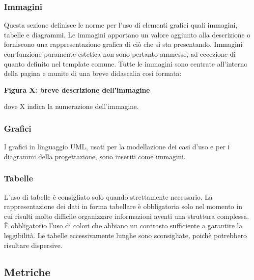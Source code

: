 \subsubsection{Immagini}\label{ProcessiDiSupportoDocumentazioneElementiGraficiImmagini}
Questa sezione definisce le norme per l'uso di elementi grafici quali immagini, tabelle e diagrammi.
Le immagini apportano un valore aggiunto alla descrizione o forniscono una rappresentazione grafica di ciò che si sta presentando. Immagini con funzione puramente estetica non sono pertanto ammesse, ad eccezione di quanto definito nel template comune. Tutte le immagini sono centrate all’interno della pagina e munite di una breve didascalia così formata:
\begin{center}
	\textbf {Figura X: breve descrizione dell'immagine}
\end{center}
dove X indica la numerazione dell'immagine.
\subsubsection{Grafici}\label{ProcessiDiSupportoDocumentazioneElementiGraficiGrafici}
I grafici in linguaggio UML, usati per la modellazione dei casi d’uso e per i diagrammi della progettazione, sono inseriti come immagini.
\subsubsection{Tabelle}\label{ProcessiDiSupportoDocumentazioneElementiGraficiTabelle}
L’uso di tabelle è consigliato solo quando strettamente necessario.
La rappresentazione dei dati in forma tabellare è obbligatoria solo nel momento in cui risulti molto difficile organizzare informazioni aventi una struttura complessa.
È obbligatorio l’uso di colori che abbiano un contrasto sufficiente a garantire la leggibilità.
Le tabelle eccessivamente lunghe sono sconsigliate, poichè potrebbero risultare dispersive.
\subsection{Metriche}\label{ProcessiDiSupportoDocumentazioneMetriche}
